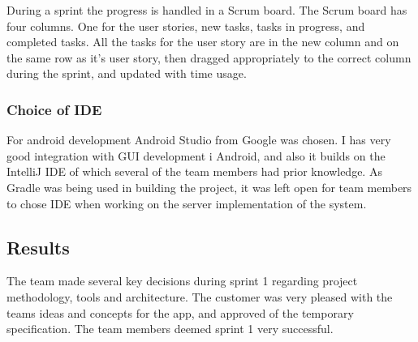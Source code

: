 During a sprint the progress is handled in a Scrum board. The Scrum board has four columns. One for the user stories, new tasks, tasks in progress, and completed tasks.
All the tasks for the user story are in the new column and on the same row as it's user story, then dragged appropriately to the correct column during the sprint, and updated with time usage.

\subsubsection{Choice of IDE}
For android development Android Studio from Google was chosen. I has very good integration with GUI development i Android, and also it builds on the IntelliJ IDE of which several of the team members had prior knowledge. As Gradle was being used in building the project, it was left open for team members to chose IDE when working on the server implementation of the system.

\subsection{Results}
The team made several key decisions during sprint 1 regarding project methodology, tools and architecture. The customer was very pleased with the teams ideas and concepts for the app, and approved of the temporary specification. The team members deemed sprint 1 very successful.